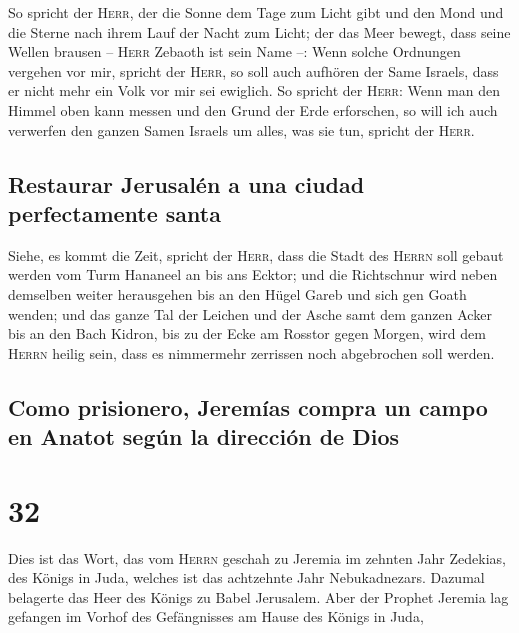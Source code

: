  So spricht der \textsc{Herr}, der die Sonne dem Tage zum
Licht gibt und den Mond und die Sterne nach ihrem Lauf der Nacht zum
Licht; der das Meer bewegt, dass seine Wellen brausen -- \textsc{Herr}
Zebaoth ist sein Name --:  Wenn solche Ordnungen vergehen
vor mir, spricht der \textsc{Herr}, so soll auch aufhören der Same
Israels, dass er nicht mehr ein Volk vor mir sei ewiglich.
 So spricht der \textsc{Herr}: Wenn man den Himmel oben
kann messen und den Grund der Erde erforschen, so will ich auch
verwerfen den ganzen Samen Israels um alles, was sie tun, spricht der
\textsc{Herr}.

\hypertarget{restaurar-jerusaluxe9n-a-una-ciudad-perfectamente-santa}{%
\subsection{Restaurar Jerusalén a una ciudad perfectamente
santa}\label{restaurar-jerusaluxe9n-a-una-ciudad-perfectamente-santa}}

 Siehe, es kommt die Zeit, spricht der \textsc{Herr},
dass die Stadt des \textsc{Herrn} soll gebaut werden vom Turm Hananeel
an bis ans Ecktor;  und die Richtschnur wird neben
demselben weiter herausgehen bis an den Hügel Gareb und sich gen Goath
wenden;  und das ganze Tal der Leichen und der Asche samt
dem ganzen Acker bis an den Bach Kidron, bis zu der Ecke am Rosstor
gegen Morgen, wird dem \textsc{Herrn} heilig sein, dass es nimmermehr
zerrissen noch abgebrochen soll werden.

\hypertarget{como-prisionero-jeremuxedas-compra-un-campo-en-anatot-seguxfan-la-direcciuxf3n-de-dios}{%
\subsection{Como prisionero, Jeremías compra un campo en Anatot según la
dirección de
Dios}\label{como-prisionero-jeremuxedas-compra-un-campo-en-anatot-seguxfan-la-direcciuxf3n-de-dios}}

\hypertarget{section-31}{%
\section{32}\label{section-31}}

 Dies ist das Wort, das vom \textsc{Herrn} geschah zu
Jeremia im zehnten Jahr Zedekias, des Königs in Juda, welches ist das
achtzehnte Jahr Nebukadnezars.  Dazumal belagerte das Heer
des Königs zu Babel Jerusalem. Aber der Prophet Jeremia lag gefangen im
Vorhof des Gefängnisses am Hause des Königs in Juda,

